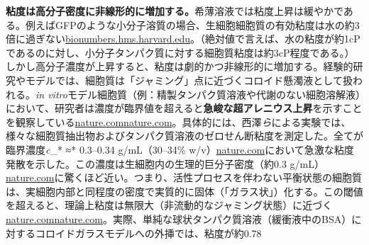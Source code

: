\textbf{粘度は高分子密度に非線形的に増加する。}希薄溶液では粘度上昇は緩やかである。例えばGFPのような小分子溶質の場合、生細胞細胞質の有効粘度は水の約3倍に過ぎない\href{https://bionumbers.hms.harvard.edu/bionumber.aspx?id=102561&ver=2\#:~:text=Value\%203,S65T\%20in}{bionumbers.hms.harvard.edu}。（絶対値で言えば、水の粘度が約1cPであるのに対し、小分子タンパク質に対する細胞質粘度は約3cP程度である。）しかし高分子濃度が上昇すると、粘度は劇的かつ非線形的に増加する。経験的研究やモデルでは、細胞質は「ジャミング」点に近づくコロイド懸濁液として扱われる。\textit{in vitro}モデル細胞質（例：精製タンパク質溶液や代謝のない細胞溶解液）において、研究者は濃度が臨界値を超えると\textbf{急峻な超アレニウス上昇}を示すことを観察している\href{https://www.nature.com/articles/s41598-017-14883-y?error=cookies_not_supported&code=b0600d9e-c852-48ed-ab9c-7526a5c6893b\#:~:text=materials\%20rapidly\%20increased\%20with\%20the,0.3\%20g\%2FmL}{nature.com}\href{https://www.nature.com/articles/s41598-017-14883-y?error=cookies_not_supported&code=b0600d9e-c852-48ed-ab9c-7526a5c6893b\#:~:text=colloidal\%20suspensions\%20close\%20to\%20their,0.3\%20g\%2FmL}{nature.com}。具体的には、西澤\textit{ら}による実験では、様々な細胞質抽出物およびタンパク質溶液のゼロせん断粘度を測定した。全てが臨界濃度\textit{c}\_* ≈* 0.3–0.34 g/mL（30–34\% w/v）\href{https://www.nature.com/articles/s41598-017-14883-y?error=cookies_not_supported&code=b0600d9e-c852-48ed-ab9c-7526a5c6893b\#:~:text=colloidal\%20suspensions\%20close\%20to\%20their,0.3\%20g\%2FmL}{nature.com}において急激な粘度発散を示した。この濃度は生細胞内の生理的巨分子密度（約0.3 g/mL）\href{https://www.nature.com/articles/s41598-017-14883-y?error=cookies_not_supported&code=b0600d9e-c852-48ed-ab9c-7526a5c6893b\#:~:text=colloidal\%20suspensions\%20close\%20to\%20their,0.3\%20g\%2FmL}{nature.com}に驚くほど近い。つまり、活性プロセスを伴わない平衡状態の細胞質は、実細胞内部と同程度の密度で実質的に固体（「ガラス状」）化する。この閾値を超えると、理論上粘度は無限大（非流動的なジャミング状態）に近づく\href{https://www.nature.com/articles/s41598-017-14883-y?error=cookies_not_supported&code=b0600d9e-c852-48ed-ab9c-7526a5c6893b\#:~:text=cancer\%20cells,0.3\%20g\%2FmL}{nature.com}\href{https://www.nature.com/articles/s41598-017-14883-y?error=cookies_not_supported&code=b0600d9e-c852-48ed-ab9c-7526a5c6893b\#:~:text=materials\%20rapidly\%20increased\%20with\%20the,0.3\%20g\%2FmL}{nature.com}。実際、単純な球状タンパク質溶液（緩衝液中のBSA）に対するコロイドガラスモデルへの外挿では、粘度が約0.78 